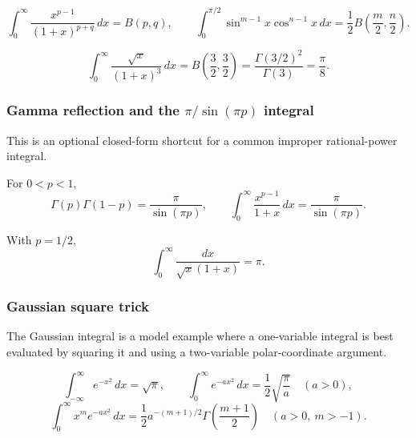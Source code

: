 \begin{keyformula}[title={Common Beta Forms}]
\[
\int_0^\infty\frac{x^{p-1}}{(1+x)^{p+q}}\,dx=B(p,q),
\qquad
\int_0^{\pi/2}\sin^{m-1}x\cos^{n-1}x\,dx
=\frac12 B\!\left(\frac m2,\frac n2\right).
\]
\end{keyformula}

\begin{examplebox}[title={Beta Integral Recognition}]
\[
\int_0^\infty\frac{\sqrt{x}}{(1+x)^3}\,dx
=B\!\left(\frac32,\frac32\right)
=\frac{\Gamma(3/2)^2}{\Gamma(3)}=\frac{\pi}{8}.
\]
\end{examplebox}

\newpage
\subsubsection{Gamma reflection and the \(\pi/\sin(\pi p)\) integral}
\begin{extension}
This is an optional closed-form shortcut for a common improper rational-power
integral.
\end{extension}

\begin{keyformula}[title={Reflection Formula Consequence}]
For \(0<p<1\),
\[
\Gamma(p)\Gamma(1-p)=\frac{\pi}{\sin(\pi p)},
\qquad
\int_0^\infty\frac{x^{p-1}}{1+x}\,dx=\frac{\pi}{\sin(\pi p)}.
\]
\end{keyformula}

\begin{examplebox}[title={Special Case}]
With \(p=1/2\),
\[
\int_0^\infty\frac{dx}{\sqrt{x}(1+x)}=\pi.
\]
\end{examplebox}

\newpage
\subsubsection{Gaussian square trick}
\begin{extension}
The Gaussian integral is a model example where a one-variable integral is best
evaluated by squaring it and using a two-variable polar-coordinate argument.
\end{extension}

\begin{keyformula}[title={Gaussian Integrals}]
\[
\int_{-\infty}^{\infty}e^{-x^2}\,dx=\sqrt\pi,
\qquad
\int_0^\infty e^{-ax^2}\,dx=\frac12\sqrt{\frac\pi a}\quad(a>0),
\]
\[
\int_0^\infty x^m e^{-ax^2}\,dx
=\frac12 a^{-(m+1)/2}\Gamma\!\left(\frac{m+1}{2}\right)
\quad(a>0,\ m>-1).
\]
\end{keyformula}

